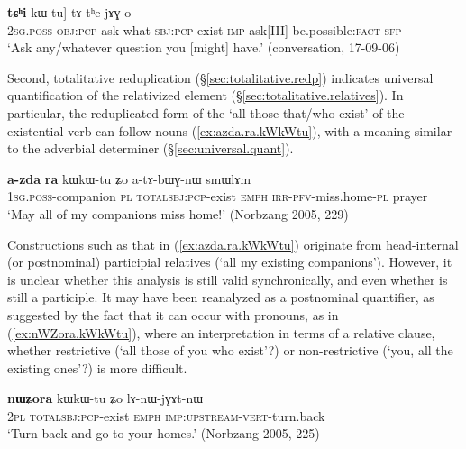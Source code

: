 \begin{exe}
\ex \label{ex:nAkAthu.tChi.kWtu}
\gll [[\textbf{nɤ-kɤ-tʰu}] \textbf{tɕʰi} kɯ-tu] tɤ-tʰe jɤɣ-o \\
\textsc{2sg}.\textsc{poss}-\textsc{obj}:\textsc{pcp}-ask what \textsc{sbj}:\textsc{pcp}-exist \textsc{imp}-ask[III] be.possible:\textsc{fact}-\textsc{sfp} \\
\glt `Ask any/whatever question you [might] have.' (conversation, 17-09-06)
\end{exe}

 
Second, totalitative reduplication (§\ref{sec:totalitative.redp}) indicates universal quantification of the relativized element (§\ref{sec:totalitative.relatives}). In particular, the reduplicated form of the  `all those that/who exist' of the existential verb  can follow nouns (\ref{ex:azda.ra.kWkWtu}), with a meaning similar to the adverbial determiner  (§\ref{sec:universal.quant}). 

\begin{exe}
\ex \label{ex:azda.ra.kWkWtu}
\gll \textbf{a-zda} \textbf{ra} kɯ\redp{}kɯ-tu ʑo a-tɤ-bɯɣ-nɯ smɯlɤm \\
\textsc{1sg}.\textsc{poss}-companion \textsc{pl} \textsc{total}\redp{}\textsc{sbj}:\textsc{pcp}-exist \textsc{emph} \textsc{irr}-\textsc{pfv}-miss.home-\textsc{pl} prayer \\
\glt `May all of my companions miss home!' (Norbzang 2005, 229)
\end{exe}

Constructions such as that in (\ref{ex:azda.ra.kWkWtu}) originate from head-internal (or postnominal) participial relatives (`all my existing companions'). However, it is unclear whether this analysis is still valid synchronically, and even whether  is still a participle. It may have been reanalyzed as a postnominal quantifier, as suggested by the fact that it can occur with pronouns, as in (\ref{ex:nWZora.kWkWtu}), where an interpretation in terms of a relative clause, whether restrictive (`all those of you who exist'?) or non-restrictive (`you, all the existing ones'?) is more difficult.
 
\begin{exe}
\ex \label{ex:nWZora.kWkWtu}
\gll  \textbf{nɯʑora} kɯ\redp{}kɯ-tu ʑo lɤ-nɯ-jɣɤt-nɯ \\
\textsc{2pl} \textsc{total}\redp{}\textsc{sbj}:\textsc{pcp}-exist \textsc{emph} \textsc{imp}:\textsc{upstream}-\textsc{vert}-turn.back \\
\glt `Turn back and go to your homes.' (Norbzang 2005, 225)
\end{exe}

